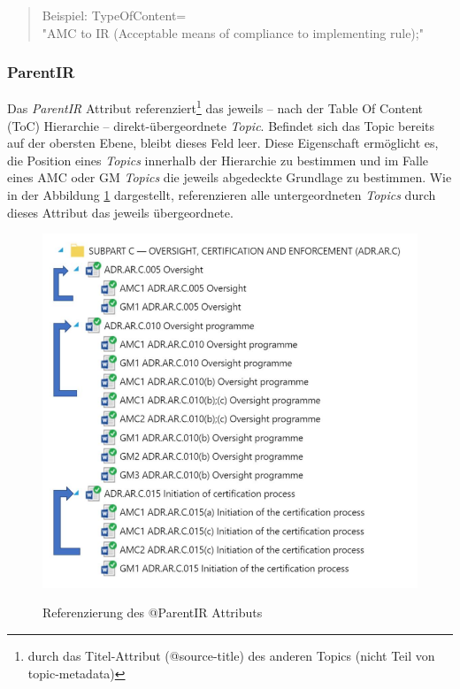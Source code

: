     \begin{quote}
    Beispiel:
    \textsf{TypeOfContent=\\"{}AMC to IR (Acceptable means of compliance to implementing rule);"}
\end{quote}

    
    \subsubsection{ParentIR}

    Das \textit{ParentIR} Attribut referenziert\footnote{durch das Titel-Attribut (@source-title) des anderen Topics (nicht Teil von topic-metadata)} das jeweils -- nach der Table Of Content (ToC) Hierarchie -- direkt-übergeordnete \textit{Topic}.
    Befindet sich das Topic bereits auf der obersten Ebene, bleibt dieses Feld leer.
    Diese Eigenschaft ermöglicht es, die Position eines \textit{Topics} innerhalb der Hierarchie zu bestimmen und im Falle eines \ac{AMC} oder \ac{GM} \textit{Topics} die jeweils abgedeckte Grundlage zu bestimmen.
    Wie in der Abbildung \ref{fig:parent_ir} dargestellt, referenzieren alle untergeordneten \textit{Topics} durch dieses Attribut das jeweils übergeordnete. 

    \begin{figure}[h]
        \centering
        \includegraphics[width=0.75\linewidth]{gfx/parentir.png}
        \caption{Referenzierung des @ParentIR Attributs }\cite[31]{easa_xml_doc}
        \label{fig:parent_ir}
    \end{figure}

    

    \pagebreak
